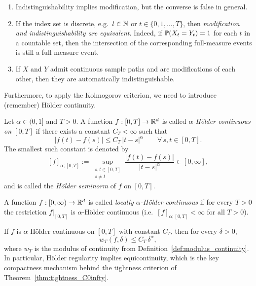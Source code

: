 \begin{remark}\label{rem:modif-vs-indist}
\begin{enumerate}[label=\textnormal{(\roman*)}, leftmargin=3.2em]
\item Indistinguishability implies modification, but the converse is false in general.
\item If the index set is discrete, e.g.\ $t\in\mathbb{N}$ or $t\in\{0,1,\dots,T\}$, then
\emph{modification and indistinguishability are equivalent}.
Indeed, if $\mathbb{P}(X_t=Y_t)=1$ for each $t$ in a countable set, then the intersection of the
corresponding full-measure events is still a full-measure event.
\item If $X$ and $Y$ admit continuous sample paths and are modifications of each other, then
they are automatically indistinguishable.
\end{enumerate}
\end{remark}

\medskip
Furthermore, to apply the Kolmogorov criterion, we need to introduce (remember) H\"older continuity.

\begin{definition}\label{def:holder_local}
Let $\alpha\in(0,1]$ and $T>0$.
A function $f:[0,T]\to\mathbb{R}^d$ is called \emph{$\alpha$-H\"older continuous on $[0,T]$} if
there exists a constant $C_T<\infty$ such that
\[
|f(t)-f(s)| \le C_T\,|t-s|^\alpha
\qquad\forall\, s,t\in[0,T].
\]
The smallest such constant is denoted by
\[
[f]_{\alpha;[0,T]} := \sup_{\substack{s,t\in[0,T]\\s\neq t}}
\frac{|f(t)-f(s)|}{|t-s|^\alpha}
\in [0,\infty],
\]
and is called the \emph{H\"older seminorm} of $f$ on $[0,T]$.
\end{definition}

\begin{definition}\label{def:holder_global}
A function $f:[0,\infty)\to\mathbb{R}^d$ is called \emph{locally $\alpha$-H\"older continuous} if
for every $T>0$ the restriction $f|_{[0,T]}$ is $\alpha$-H\"older continuous
(i.e.\ $[f]_{\alpha;[0,T]}<\infty$ for all $T>0$).
\end{definition}

\begin{remark}\label{rem:holder_modulus}
If $f$ is $\alpha$-H\"older continuous on $[0,T]$ with constant $C_T$, then for every $\delta>0$,
\[
w_T(f,\delta)\le C_T\,\delta^\alpha,
\]
where $w_T$ is the modulus of continuity from Definition~\ref{def:modulus_continuity}.
In particular, H\"older regularity implies equicontinuity, which is the key compactness
mechanism behind the tightness criterion of Theorem~\ref{thm:tightness_C0infty}.
\end{remark}

